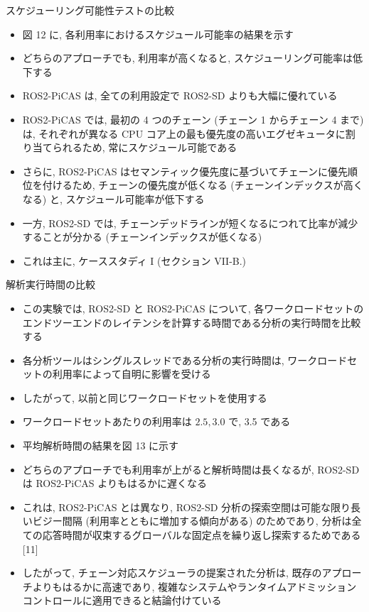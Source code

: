 \begin{frame}{スケジューリング可能性テストの比較}
    \begin{itemize}
        \item 図 12 に, 各利用率におけるスケジュール可能率の結果を示す
\item どちらのアプローチでも, 利用率が高くなると, スケジューリング可能率は低下する
\item ROS2-PiCAS は, 全ての利用設定で ROS2-SD よりも大幅に優れている
\item ROS2-PiCAS では, 最初の 4 つのチェーン (チェーン 1 からチェーン 4 まで) は, それぞれが異なる CPU コア上の最も優先度の高いエグゼキュータに割り当てられるため, 常にスケジュール可能である
\item さらに, ROS2-PiCAS はセマンティック優先度に基づいてチェーンに優先順位を付けるため, チェーンの優先度が低くなる (チェーンインデックスが高くなる) と, スケジュール可能率が低下する
\item 一方, ROS2-SD では, チェーンデッドラインが短くなるにつれて比率が減少することが分かる (チェーンインデックスが低くなる)
\item これは主に, ケーススタディ I (セクション VII-B.)
    \end{itemize}
\end{frame}

\begin{frame}{解析実行時間の比較}
    \begin{itemize}
        \item この実験では, ROS2-SD と ROS2-PiCAS について, 各ワークロードセットのエンドツーエンドのレイテンシを計算する時間である分析の実行時間を比較する
\item 各分析ツールはシングルスレッドである分析の実行時間は, ワークロードセットの利用率によって自明に影響を受ける
\item したがって, 以前と同じワークロードセットを使用する
\item ワークロードセットあたりの利用率は $2.5,3.0$ で, 3.5 である
\item 平均解析時間の結果を図 13 に示す
\item どちらのアプローチでも利用率が上がると解析時間は長くなるが, ROS2-SD は ROS2-PiCAS よりもはるかに遅くなる
\item これは, ROS2-PiCAS とは異なり, ROS2-SD 分析の探索空間は可能な限り長いビジー間隔 (利用率とともに増加する傾向がある) のためであり, 分析は全ての応答時間が収束するグローバルな固定点を繰り返し探索するためである [11]
\item したがって, チェーン対応スケジューラの提案された分析は, 既存のアプローチよりもはるかに高速であり, 複雑なシステムやランタイムアドミッションコントロールに適用できると結論付けている
    \end{itemize}
\end{frame}
